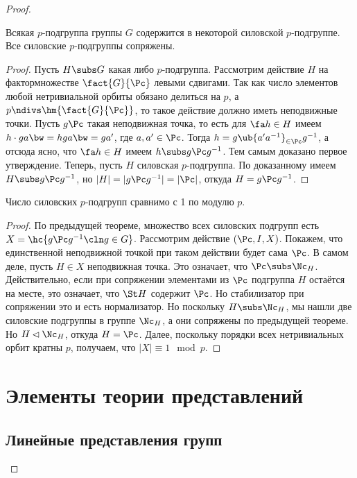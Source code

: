 \documentclass[a4paper]{article}
\begin{document}
\begin{proof}
\begin{theorem}
Всякая $p$-подгруппа группы $G$ содержится в некоторой силовской $p$-подгруппе.  Все силовские $p$-подгруппы
сопряжены.
\end{theorem}
\begin{proof}
Пусть $H \subs G$ какая либо $p$-подгруппа. Рассмотрим действие $H$ на  фактормножестве $\fact{G}{\Pc}$
левыми сдвигами. Так как число элементов любой нетривиальной орбиты обязано делиться на $p$, а $p \ndivs
\hm{\fact{G}{\Pc}}$, то такое действие должно иметь неподвижные точки. Пусть $g\Pc$ такая неподвижная
точка, то есть для $\fa h \in H$ имеем $h \cdot ga \bw= hga \bw= ga'$, где $a, a' \in \Pc$. Тогда $h = g\ub{a'a^{-1}}_{\in
\Pc}g^{-1}$, а отсюда ясно, что $\fa h \in H$ имеем $h \subs g\Pc g^{-1}$. Тем самым доказано первое
утверждение. Теперь, пусть $H$ силовская $p$-подгруппа. По доказанному имеем $H \subs g\Pc g^{-1}$, но
$|H|=|g\Pc g^{-1}|=|\Pc|$, откуда $H = g\Pc g^{-1}$.
\end{proof}

\begin{theorem}
Число силовских $p$-подгрупп сравнимо с 1 по модулю $p$.
\end{theorem}
\begin{proof}
По предыдущей теореме, множество всех силовских подгрупп есть  $X = \hc{g\Pc g^{-1}\cln g \in G}$. Рассмотрим
действие $(\Pc, I, X)$. Покажем, что единственной неподвижной точкой при таком действии будет сама $\Pc$. В
самом деле, пусть $H \in X$ неподвижная точка. Это означает, что $\Pc \subs \Nc_H$. Действительно, если при
сопряжении элементами из $\Pc$ подгруппа $H$ остаётся на месте, это означает, что $\St H$ содержит $\Pc$. Но
стабилизатор при сопряжении это и есть нормализатор. Но поскольку $H \subs \Nc_H$, мы нашли две силовские
подгруппы в группе $\Nc_H$, а они сопряжены по предыдущей теореме. Но $H \lhd \Nc_H$, откуда $H = \Pc$.
Далее, поскольку порядки всех нетривиальных орбит кратны $p$, получаем, что $|X| \equiv 1 \mod p$.
\end{proof}

\section{Элементы теории представлений}

\subsection{Линейные представления групп}


\end{proof}
\end{document}
